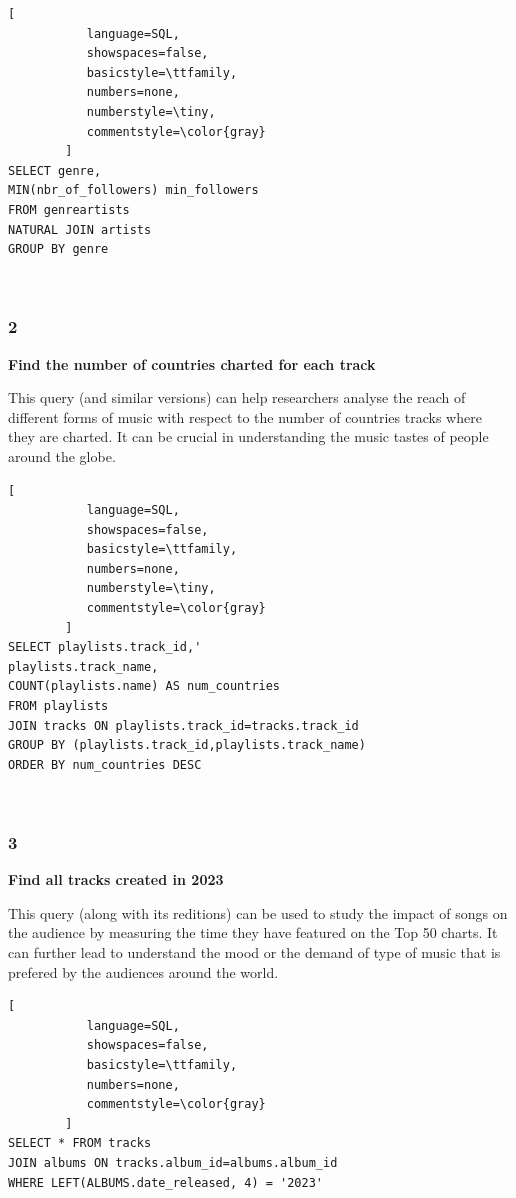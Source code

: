 \documentclass[conference]{IEEEtran}
\begin{document}
\begin{lstlisting}[
           language=SQL,
           showspaces=false,
           basicstyle=\ttfamily,
           numbers=none,
           numberstyle=\tiny,
           commentstyle=\color{gray}
        ]
SELECT genre, 
MIN(nbr_of_followers) min_followers
FROM genreartists 
NATURAL JOIN artists 
GROUP BY genre
\end{lstlisting} \ 

\subsubsection*{2} \textbf{Find the number of countries charted for each track}

This query (and similar versions) can help researchers analyse the reach of different forms of music with respect to the number of countries tracks where they are charted. It can be crucial in understanding the music tastes of people around the globe. \linebreak  

\begin{lstlisting}[
           language=SQL,
           showspaces=false,
           basicstyle=\ttfamily,
           numbers=none,
           numberstyle=\tiny,
           commentstyle=\color{gray}
        ]
SELECT playlists.track_id,'
playlists.track_name,
COUNT(playlists.name) AS num_countries
FROM playlists
JOIN tracks ON playlists.track_id=tracks.track_id
GROUP BY (playlists.track_id,playlists.track_name)
ORDER BY num_countries DESC
\end{lstlisting} \ 

\subsubsection*{3} \textbf{Find all tracks created in 2023}

This query (along with its reditions) can be used to study the impact of songs on the audience by measuring the time they have featured on the Top 50 charts. It can further lead to understand the mood or the demand of type of music that is prefered by the audiences around the world. \linebreak  

\begin{lstlisting}[
           language=SQL,
           showspaces=false,
           basicstyle=\ttfamily,
           numbers=none,
           commentstyle=\color{gray}
        ]
SELECT * FROM tracks
JOIN albums ON tracks.album_id=albums.album_id
WHERE LEFT(ALBUMS.date_released, 4) = '2023'
\end{lstlisting} \ 
\end{document}
